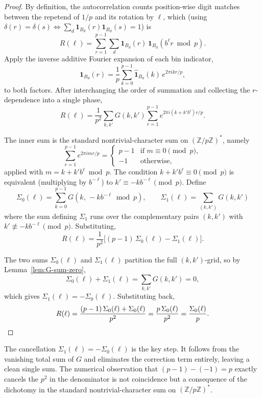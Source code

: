 \documentclass[12pt]{amsart}
\theoremstyle{definition}
\theoremstyle{remark}
\begin{document}
\begin{proof}
By definition, the autocorrelation counts position-wise
digit matches between the repetend of $1/p$ and its rotation
by $\ell$, which (using $\delta(r) = \delta(s) \iff
\sum_d \mathbf{1}_{B_d}(r) \mathbf{1}_{B_d}(s) = 1$) is
\[
R(\ell) = \sum_{r=1}^{p-1} \sum_d
\mathbf{1}_{B_d}(r)\, \mathbf{1}_{B_d}(b^{\ell} r \bmod p).
\]
Apply the inverse additive Fourier expansion of each bin
indicator,
\[
\mathbf{1}_{B_d}(r) = \frac{1}{p} \sum_{k=0}^{p-1}
\widehat{\mathbf{1}}_{B_d}(k)\, e^{2\pi i k r / p},
\]
to both factors. After interchanging the order of summation
and collecting the $r$-dependence into a single phase,
\[
R(\ell) = \frac{1}{p^{2}}
\sum_{k, k'} G(k, k')
\sum_{r=1}^{p-1}
e^{2\pi i (k + k' b^{\ell}) r / p}.
\]

The inner sum is the standard nontrivial-character sum on
$(\mathbb{Z}/p\mathbb{Z})^*$, namely
\[
\sum_{r=1}^{p-1} e^{2\pi i m r / p}
=
\begin{cases}
p - 1 & \text{if } m \equiv 0 \pmod p, \\
-1 & \text{otherwise},
\end{cases}
\]
applied with $m = k + k' b^{\ell} \bmod p$. The condition
$k + k' b^{\ell} \equiv 0 \pmod p$ is equivalent (multiplying
by $b^{-\ell}$) to $k' \equiv -k b^{-\ell} \pmod p$. Define
\[
\Sigma_0(\ell) = \sum_{k = 0}^{p-1}
G\!\left(k,\, -k b^{-\ell} \bmod p\right),
\qquad
\Sigma_1(\ell) = \sum_{(k, k')} G(k, k')
\]
where the sum defining $\Sigma_1$ runs over the complementary
pairs $(k, k')$ with $k' \not\equiv -k b^{-\ell} \pmod p$.
Substituting,
\[
R(\ell) = \frac{1}{p^{2}}
\bigl[(p - 1)\, \Sigma_0(\ell) - \Sigma_1(\ell)\bigr].
\]

The two sums $\Sigma_0(\ell)$ and $\Sigma_1(\ell)$ partition
the full $(k, k')$-grid, so by Lemma~\ref{lem:G-sum-zero},
\[
\Sigma_0(\ell) + \Sigma_1(\ell)
= \sum_{k, k'} G(k, k') = 0,
\]
which gives $\Sigma_1(\ell) = -\Sigma_0(\ell)$.
Substituting back,
\[
R(\ell) = \frac{(p - 1)\, \Sigma_0(\ell)
+ \Sigma_0(\ell)}{p^{2}}
= \frac{p\, \Sigma_0(\ell)}{p^{2}}
= \frac{\Sigma_0(\ell)}{p}.
\qedhere
\]
\end{proof}

The cancellation $\Sigma_1(\ell) = -\Sigma_0(\ell)$ is the
key step. It follows from the vanishing total sum of $G$ and
eliminates the correction term entirely, leaving a clean
single sum. The numerical observation that $(p - 1) - (-1) = p$
exactly cancels the $p^2$ in the denominator is not coincidence
but a consequence of the dichotomy in the standard
nontrivial-character sum on $(\mathbb{Z}/p\mathbb{Z})^*$.
\end{document}

